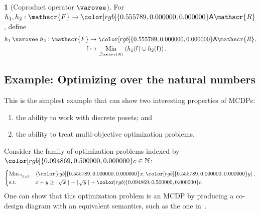 \documentclass[twocolumn,english]{IEEEtran}
\theoremstyle{definition}
\newtheorem{defn}{\protect\definitionname}
\theoremstyle{plain}
\theoremstyle{definition}
\theoremstyle{remark}
\theoremstyle{definition}
\theoremstyle{plain}
\theoremstyle{plain}
\newcommand{\aword}[1]{\mathsf{#1}}
\newcommand{\vmath}[1]{\aword{#1}}
\newcommand{\subto}{\text{s.t.}}
\DeclareMathOperator*{\Min}{Min}
\newcommand{\posleq}{\preceq}
\newcommand{\antichains}{\vmath{A}}
\newcommand{\ftor}{{h}}
\newcommand{\funsp}{\mathscr{F}}
\newcommand{\fun}{\vmath{f}}
\newcommand{\ressp}{\mathscr{R}}
\newcommand{\Aressp}{{\antichains\ressp}}
\newcommand{\opcoprod}{\mathbin{\varovee}}
\newcommand{\colR}{\color[rgb]{0.555789,0.000000,0.000000}}
\newcommand{\colF}{\color[rgb]{0.094869,0.500000,0.000000}}
\renewcommand{\Aressp}{{\colR\antichains\ressp}}
\providecommand{\definitionname}{Definition}
\begin{document}
\begin{defn}[Coproduct operator $\opcoprod$]
\label{def:opcoprod}For $\ftor_{1},\ftor_{2}:\funsp\rightarrow\Aressp$,
define
\begin{align*}
\ftor_{1}\opcoprod\ftor_{2}:\funsp & \rightarrow\Aressp,\\
\fun & \mapsto\Min_{\posleq_{\ressp}}\left(\ftor_{1}(\fun)\cup\ftor_{2}(\fun)\right).
\end{align*}
\end{defn}


\subsection{Example: Optimizing over the natural numbers}

This is the simplest example that can show two interesting properties
of MCDPs: 
\begin{enumerate}
\item the ability to work with discrete posets; and 
\item the ability to treat multi-objective optimization problems.
\end{enumerate}
Consider the family of optimization problems indexed by~${\colF c}\in\mathbb{N}$:
\begin{equation}
\begin{cases}
\Min_{\posleq_{\overline{\mathbb{N}}\times\overline{\mathbb{N}}}} & \left\langle {\colR x},{\colR y}\right\rangle ,\\
\subto & x+y\geq\lceil\sqrt{x}\,\rceil+\lceil\sqrt{y}\,\rceil+{\colF c}.
\end{cases}\label{eq:example-1}
\end{equation}
One can show that this optimization problem is an MCDP by producing
a co-design diagram with an equivalent semantics, such as the one
in~. 
\end{document}
